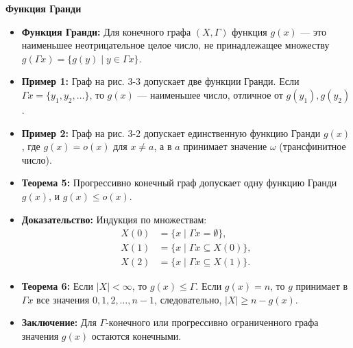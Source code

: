 \textbf{Функция Гранди}

\begin{itemize}
    \item \textbf{Функция Гранди:} Для конечного графа $(X, \Gamma)$ функция $g(x)$ — это наименьшее неотрицательное целое число, не принадлежащее множеству $g(\Gamma x) = \{g(y) \mid y \in \Gamma x\}$.
    \item \textbf{Пример 1:} Граф на рис. 3-3 допускает две функции Гранди. Если $\varGamma x = \{y_1, y_2, \ldots\}$, то $g(x)$ — наименьшее число, отличное от $g(y_1), g(y_2)$.
    \item \textbf{Пример 2:} Граф на рис. 3-2 допускает единственную функцию Гранди $g(x)$, где $g(x) = o(x)$ для $x \neq a$, а в $a$ принимает значение $\omega$ (трансфинитное число).
    \item \textbf{Теорема 5:} Прогрессивно конечный граф допускает одну функцию Гранди $g(x)$, и $g(x) \leq o(x)$.
    \item \textbf{Доказательство:} Индукция по множествам:
    \begin{align*}
        X(0) &= \{x \mid \varGamma x = \emptyset\}, \\
        X(1) &= \{x \mid \varGamma x \subseteq X(0)\}, \\
        X(2) &= \{x \mid \varGamma x \subseteq X(1)\}.
    \end{align*}
    \item \textbf{Теорема 6:} Если $|X| < \infty$, то $g(x) \leq \Gamma$. Если $g(x) = n$, то $g$ принимает в $\varGamma x$ все значения $0, 1, 2, \ldots, n-1$, следовательно, $|X| \geq n - g(x)$.
    \item \textbf{Заключение:} Для $\Gamma$-конечного или прогрессивно ограниченного графа значения $g(x)$ остаются конечными.
\end{itemize}